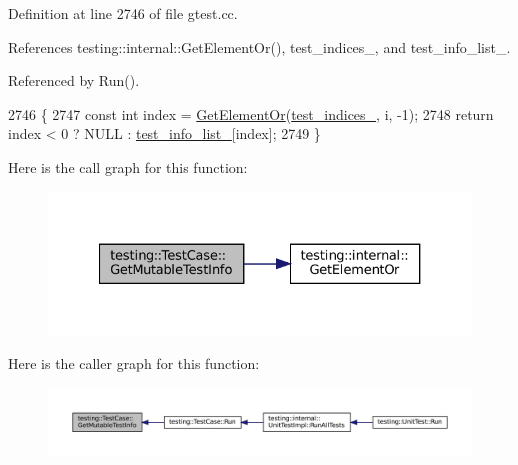 Definition at line 2746 of file gtest.\+cc.



References testing\+::internal\+::\+Get\+Element\+Or(), test\+\_\+indices\+\_\+, and test\+\_\+info\+\_\+list\+\_\+.



Referenced by Run().


\begin{DoxyCode}
2746                                             \{
2747   \textcolor{keyword}{const} \textcolor{keywordtype}{int} index = \hyperlink{namespacetesting_1_1internal_a71fdd20a0686bea3dc0cdcd95e0bca1c}{GetElementOr}(\hyperlink{classtesting_1_1TestCase_a6bb04b98c46a3eecf7a4e6f62593a827}{test\_indices\_}, i, -1);
2748   \textcolor{keywordflow}{return} index < 0 ? NULL : \hyperlink{classtesting_1_1TestCase_adce272a48399dd67a7bdd14fa7e99b80}{test\_info\_list\_}[index];
2749 \}
\end{DoxyCode}
Here is the call graph for this function\+:
\nopagebreak
\begin{figure}[H]
\begin{center}
\leavevmode
\includegraphics[width=327pt]{classtesting_1_1TestCase_aee03569f8ecb89cfe479e71f11edc3ea_cgraph}
\end{center}
\end{figure}
Here is the caller graph for this function\+:
\nopagebreak
\begin{figure}[H]
\begin{center}
\leavevmode
\includegraphics[width=350pt]{classtesting_1_1TestCase_aee03569f8ecb89cfe479e71f11edc3ea_icgraph}
\end{center}
\end{figure}
\mbox{\label{classtesting_1_1TestCase_a441e0eca232643671dc365c2924c255c}} 
